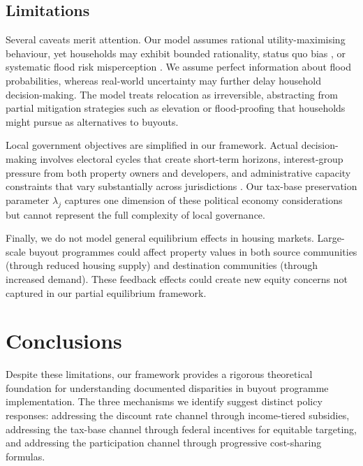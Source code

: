 \documentclass[12pt,a4paper]{article}
\begin{document}
\subsection{Limitations}

Several caveats merit attention. Our model assumes rational utility-maximising behaviour, yet households may exhibit bounded rationality, status quo bias \citep{samuelson1988status}, or systematic flood risk misperception \citep{meyer2017ostrich}. We assume perfect information about flood probabilities, whereas real-world uncertainty may further delay household decision-making. The model treats relocation as irreversible, abstracting from partial mitigation strategies such as elevation or flood-proofing that households might pursue as alternatives to buyouts.

Local government objectives are simplified in our framework. Actual decision-making involves electoral cycles that create short-term horizons, interest-group pressure from both property owners and developers, and administrative capacity constraints that vary substantially across jurisdictions \citep{greer2017historical}. Our tax-base preservation parameter $\lambda_j$ captures one dimension of these political economy considerations but cannot represent the full complexity of local governance.

Finally, we do not model general equilibrium effects in housing markets. Large-scale buyout programmes could affect property values in both source communities (through reduced housing supply) and destination communities (through increased demand). These feedback effects could create new equity concerns not captured in our partial equilibrium framework.


\section{Conclusions}\label{sec:conclusions}

Despite these limitations, our framework provides a rigorous theoretical foundation for understanding documented disparities in buyout programme implementation. The three mechanisms we identify suggest distinct policy responses: addressing the discount rate channel through income-tiered subsidies, addressing the tax-base channel through federal incentives for equitable targeting, and addressing the participation channel through progressive cost-sharing formulas.
\end{document}
